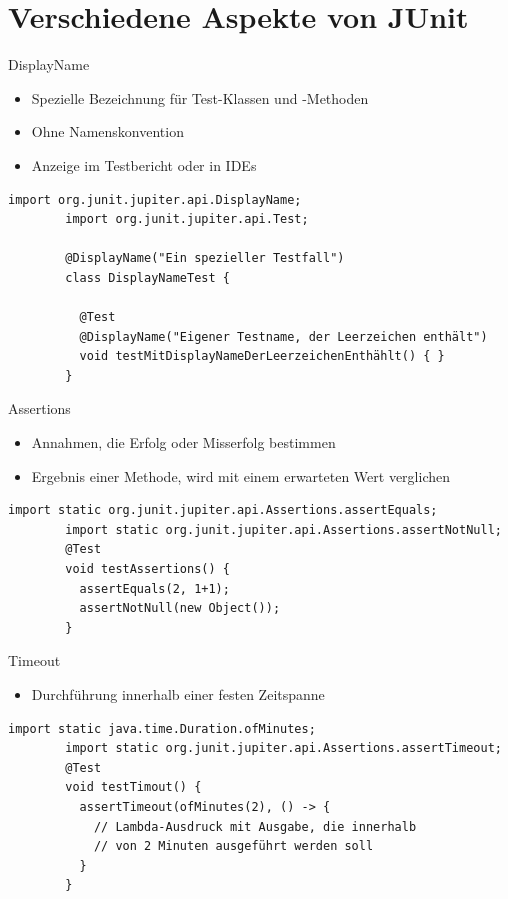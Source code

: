 \documentclass[utf8,t,aspectratio=169]{beamer}
\begin{document}
  \section{Verschiedene Aspekte von JUnit}
    \begin{frame}[fragile]{DisplayName}
      \begin{itemize}
        \item Spezielle Bezeichnung für Test-Klassen und -Methoden
        \item Ohne Namenskonvention
        \item Anzeige im Testbericht oder in IDEs
      \end{itemize}
      \begin{lstlisting}[gobble=8]
        import org.junit.jupiter.api.DisplayName;
        import org.junit.jupiter.api.Test;

        @DisplayName("Ein spezieller Testfall")
        class DisplayNameTest {

          @Test
          @DisplayName("Eigener Testname, der Leerzeichen enthält")
          void testMitDisplayNameDerLeerzeichenEnthählt() { }
        }
      \end{lstlisting}
    \end{frame}
    \begin{frame}[fragile]{Assertions}
      \begin{itemize}
        \item Annahmen, die Erfolg oder Misserfolg bestimmen
          \item Ergebnis einer Methode, wird mit einem erwarteten Wert
            verglichen
      \end{itemize}
      \begin{lstlisting}[gobble=8]
        import static org.junit.jupiter.api.Assertions.assertEquals;
        import static org.junit.jupiter.api.Assertions.assertNotNull;
        @Test
        void testAssertions() {
          assertEquals(2, 1+1);
          assertNotNull(new Object());
        }
      \end{lstlisting}
    \end{frame}
    \begin{frame}[fragile]{Timeout}
      \begin{itemize}
        \item Durchführung innerhalb einer festen Zeitspanne
      \end{itemize}
      \begin{lstlisting}[gobble=8]
        import static java.time.Duration.ofMinutes;
        import static org.junit.jupiter.api.Assertions.assertTimeout;
        @Test
        void testTimout() {
          assertTimeout(ofMinutes(2), () -> {
            // Lambda-Ausdruck mit Ausgabe, die innerhalb
            // von 2 Minuten ausgeführt werden soll
          }
        }
      \end{lstlisting}
    \end{frame}
\end{document}
